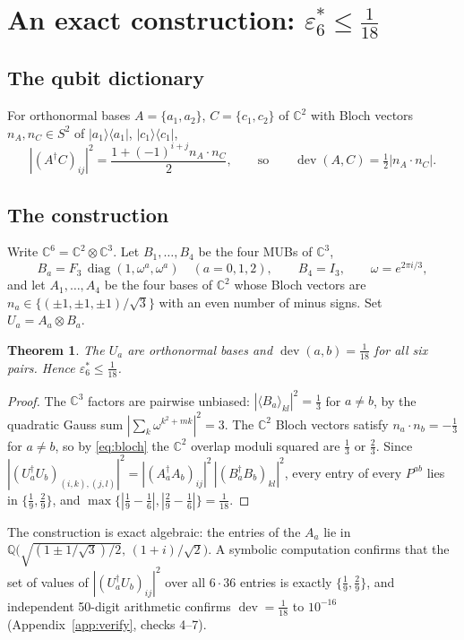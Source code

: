 \documentclass[11pt,a4paper]{article}
\newtheorem{theorem}{Theorem}[section]
\theoremstyle{remark}
\newcommand{\C}{\mathbb{C}}
\newcommand{\dev}{\operatorname{dev}}
\newcommand{\eps}{\varepsilon}
\begin{document}
\section{An exact construction: $\eps_6^*\le\tfrac1{18}$}
\label{sec:tetra}

\subsection{The qubit dictionary}
For orthonormal bases $A=\{a_1,a_2\}$, $C=\{c_1,c_2\}$ of $\C^2$ with Bloch vectors
$n_A,n_C\in S^2$ of $|a_1\rangle\langle a_1|$, $|c_1\rangle\langle c_1|$,
\begin{equation}\label{eq:bloch}
|(A^\dagger C)_{ij}|^2=\frac{1+(-1)^{i+j}n_A\cdot n_C}{2},
\qquad\text{so}\qquad \dev(A,C)=\tfrac12|n_A\cdot n_C| .
\end{equation}

\subsection{The construction}
Write $\C^6=\C^2\otimes\C^3$.  Let $B_1,\dots,B_4$ be the four MUBs of $\C^3$,
\[
B_a=F_3\,\operatorname{diag}(1,\omega^a,\omega^a)\quad(a=0,1,2),\qquad B_4=I_3,
\qquad \omega=e^{2\pi i/3},
\]
and let $A_1,\dots,A_4$ be the four bases of $\C^2$ whose Bloch vectors are
$n_a\in\{(\pm1,\pm1,\pm1)/\sqrt3\}$ with an even number of minus signs.  Set
$U_a=A_a\otimes B_a$.

\begin{theorem}\label{thm:tetra}
The $U_a$ are orthonormal bases and $\dev(a,b)=\tfrac1{18}$ for all six pairs.  Hence
$\eps_6^*\le\tfrac1{18}$.
\end{theorem}
\begin{proof}
The $\C^3$ factors are pairwise unbiased: $|\langle B_a\rangle_{kl}|^2=\tfrac13$ for $a\ne b$,
by the quadratic Gauss sum $|\sum_{k}\omega^{k^2+mk}|^2=3$.  The $\C^2$ Bloch vectors satisfy
$n_a\cdot n_b=-\tfrac13$ for $a\ne b$, so by \eqref{eq:bloch} the $\C^2$ overlap moduli
squared are $\tfrac13$ or $\tfrac23$.  Since
$|(U_a^\dagger U_b)_{(i,k),(j,l)}|^2=|(A_a^\dagger A_b)_{ij}|^2\,|(B_a^\dagger B_b)_{kl}|^2$,
every entry of every $P^{ab}$ lies in $\{\tfrac19,\tfrac29\}$, and
$\max\{|\tfrac19-\tfrac16|,|\tfrac29-\tfrac16|\}=\tfrac1{18}$.
\end{proof}

The construction is exact algebraic: the entries of the $A_a$ lie in
$\mathbb Q\bigl(\sqrt{(1\pm1/\sqrt3)/2},\,(1+i)/\sqrt2\bigr)$.  A symbolic computation
confirms that the set of values of $|(U_a^\dagger U_b)_{ij}|^2$ over all $6\cdot36$ entries is
exactly $\{\tfrac19,\tfrac29\}$, and independent 50-digit arithmetic confirms
$\dev=\tfrac1{18}$ to $10^{-16}$ (Appendix~\ref{app:verify}, checks 4--7).
\end{document}
